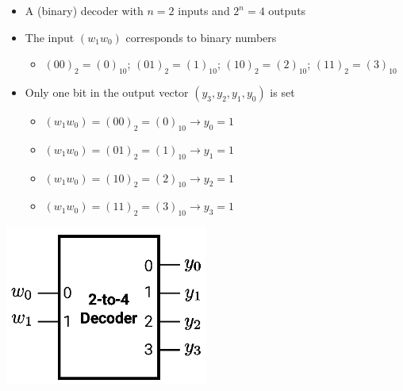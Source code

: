 \documentclass[12pt,openany]{book}
\begin{document}
\begin{minipage}{0.55\textwidth}
	\begin{itemize}
		\setlength\itemsep{2px}
	    \item[] A (binary) decoder with $n = 2$ inputs and $2^n = 4$ outputs
	    \item[] The input $(w_1w_0)$ corresponds to binary numbers
	    \begin{itemize}
	        \item $(00)_2 = (0)_{10}$; $(01)_2 = (1)_{10}$; $(10)_2 = (2)_{10}$; $(11)_2 = (3)_{10}$
	    \end{itemize}
	    \item[] Only one bit in the output vector $(y_3, y_2, y_1, y_0)$ is set
	    \begin{itemize}
			\setlength\itemsep{2px}
	        \item $(w_1w_0) = (00)_2 = (0)_{10} \rightarrow y_0 = 1$
	        \item $(w_1w_0) = (01)_2 = (1)_{10} \rightarrow y_1 = 1$
	        \item $(w_1w_0) = (10)_2 = (2)_{10} \rightarrow y_2 = 1$
	        \item $(w_1w_0) = (11)_2 = (3)_{10} \rightarrow y_3 = 1$
	    \end{itemize}
	\end{itemize}
\end{minipage}
\hfill
\vline
\hfill
\begin{minipage}{0.4\textwidth}
	    \centering
	    \includegraphics[width=0.5\textwidth]{circuits/16.1_2.png}
\end{minipage}
\vspace*{10px}
\end{document}

